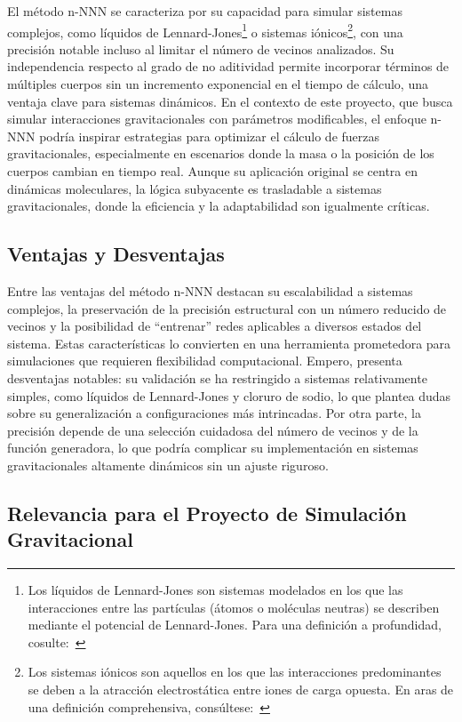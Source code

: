 El método n-NNN se caracteriza por su capacidad para simular sistemas complejos, como líquidos de Lennard-Jones\footnote{Los líquidos de Lennard-Jones son sistemas modelados en los que las interacciones entre las partículas (átomos o moléculas neutras) se describen mediante el potencial de Lennard-Jones. Para una definición a profundidad, cosulte:~\cite{Allen2017}} o sistemas iónicos\footnote{Los sistemas iónicos son aquellos en los que las interacciones predominantes se deben a la atracción electrostática entre iones de carga opuesta. En aras de una definición comprehensiva, consúltese:~\cite{Atkins2008}}, con una precisión notable incluso al limitar el número de vecinos analizados. Su independencia respecto al grado de no aditividad permite incorporar términos de múltiples cuerpos sin un incremento exponencial en el tiempo de cálculo, una ventaja clave para sistemas dinámicos. En el contexto de este proyecto, que busca simular interacciones gravitacionales con parámetros modificables, el enfoque n-NNN podría inspirar estrategias para optimizar el cálculo de fuerzas gravitacionales, especialmente en escenarios donde la masa o la posición de los cuerpos cambian en tiempo real. Aunque su aplicación original se centra en dinámicas moleculares, la lógica subyacente es trasladable a sistemas gravitacionales, donde la eficiencia y la adaptabilidad son igualmente críticas.

\subsection{Ventajas y Desventajas}

Entre las ventajas del método n-NNN destacan su escalabilidad a sistemas complejos, la preservación de la precisión estructural con un número reducido de vecinos y la posibilidad de ``entrenar'' redes aplicables a diversos estados del sistema. Estas características lo convierten en una herramienta prometedora para simulaciones que requieren flexibilidad computacional. Empero, presenta desventajas notables: su validación se ha restringido a sistemas relativamente simples, como líquidos de Lennard-Jones y cloruro de sodio, lo que plantea dudas sobre su generalización a configuraciones más intrincadas. Por otra parte, la precisión depende de una selección cuidadosa del número de vecinos y de la función generadora, lo que podría complicar su implementación en sistemas gravitacionales altamente dinámicos sin un ajuste riguroso.

\subsection{Relevancia para el Proyecto de Simulación Gravitacional}

